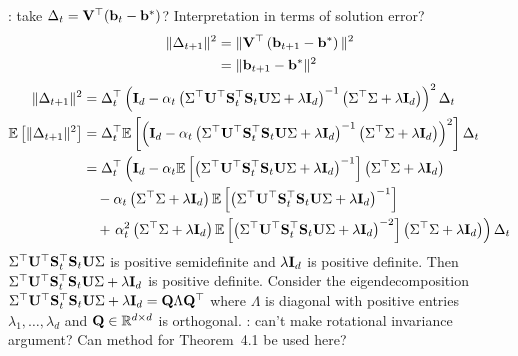 \documentclass[10pt]{article}
\begin{document}
\todo: take $\Delta_t=\mathbf{V}^\top(\mathbf{b}_t-\mathbf{b}^*)$? Interpretation in terms of solution error?
\begin{align*}
\|\Delta_{t+1}\|^2 &= \|\mathbf{V}^\top\left(\mathbf{b}_{t+1}-\mathbf{b}^*\right)\|^2 \\
&= \|\mathbf{b}_{t+1}-\mathbf{b}^*\|^2
\end{align*}
\begin{align*}
\|\Delta_{t+1}\|^2 &= \Delta_t^\top\left(\mathbf{I}_d - \alpha_t\left(\Sigma^\top\mathbf{U}^\top\mathbf{S}_t^\top\mathbf{S}_t\mathbf{U}\Sigma + \lambda\mathbf{I}_d\right)^{-1}\left(\Sigma^\top\Sigma + \lambda\mathbf{I}_d\right)\right)^2\Delta_t \\
\mathbb{E}\left[\|\Delta_{t+1}\|^2\right] &= \Delta_t^\top\mathbb{E}\left[\left(\mathbf{I}_d - \alpha_t\left(\Sigma^\top\mathbf{U}^\top\mathbf{S}_t^\top\mathbf{S}_t\mathbf{U}\Sigma + \lambda\mathbf{I}_d\right)^{-1}\left(\Sigma^\top\Sigma + \lambda\mathbf{I}_d\right)\right)^2\right]\Delta_t \\
&= \Delta_t^\top\left(\mathbf{I}_d - \alpha_t\mathbb{E}\left[\left(\Sigma^\top\mathbf{U}^\top\mathbf{S}_t^\top\mathbf{S}_t\mathbf{U}\Sigma + \lambda\mathbf{I}_d\right)^{-1}\right]\left(\Sigma^\top\Sigma + \lambda\mathbf{I}_d\right) \right.  \\
&\quad- \alpha_t\left(\Sigma^\top\Sigma + \lambda\mathbf{I}_d\right)\mathbb{E}\left[\left(\Sigma^\top\mathbf{U}^\top\mathbf{S}_t^\top\mathbf{S}_t\mathbf{U}\Sigma + \lambda\mathbf{I}_d\right)^{-1}\right] \\
&\quad + \left. \alpha_t^2\left(\Sigma^\top\Sigma + \lambda\mathbf{I}_d\right)\mathbb{E}\left[\left(\Sigma^\top\mathbf{U}^\top\mathbf{S}_t^\top\mathbf{S}_t\mathbf{U}\Sigma+ \lambda\mathbf{I}_d\right)^{-2}\right]\left(\Sigma^\top\Sigma + \lambda\mathbf{I}_d\right)\right)\Delta_t
\end{align*}
$\Sigma^\top\mathbf{U}^\top\mathbf{S}_t^\top\mathbf{S}_t\mathbf{U}\Sigma$ is positive semidefinite and $\lambda\mathbf{I}_d$ is positive definite. Then $\Sigma^\top\mathbf{U}^\top\mathbf{S}_t^\top\mathbf{S}_t\mathbf{U}\Sigma + \lambda\mathbf{I}_d$ is positive definite. Consider the eigendecomposition $\Sigma^\top\mathbf{U}^\top\mathbf{S}_t^\top\mathbf{S}_t\mathbf{U}\Sigma + \lambda\mathbf{I}_d = \mathbf{Q}\Lambda\mathbf{Q}^\top$ where $\Lambda$ is diagonal with positive entries $\lambda_1,\ldots,\lambda_d$ and $\mathbf{Q}\in\mathbb{R}^{d\times d}$ is orthogonal. \todo: can't make rotational invariance argument? Can method for Theorem~4.1 be used here?
\\
\end{document}
